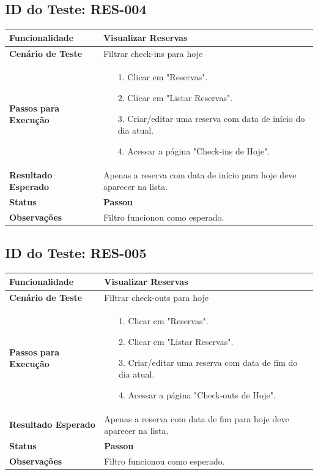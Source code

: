 \documentclass[
	12pt,				%
	openany,			%
	oneside,			%
	a4paper,			%
	english,			%
	french,				%
	spanish,			%
	brazil				%
	]{abntex2}
\begin{document}
\begin{apendicesenv}
\subsection*{ID do Teste: RES-004}
\begin{tabular}{@{} p{5cm} p{11cm} @{}}
	\toprule
	\textbf{Funcionalidade} & Visualizar Reservas \\
	\midrule
	\textbf{Cenário de Teste} & Filtrar check-ins para hoje \\
	\midrule
	\textbf{Passos para Execução} &
	\begin{itemize} \itemsep0em 
		\item[1.] Clicar em "Reservas".
		\item[2.] Clicar em "Listar Reservas".
		\item[3.] Criar/editar uma reserva com data de início do dia atual.
		\item[4.] Acessar a página "Check-ins de Hoje".
	\end{itemize} \\
	\midrule
	\textbf{Resultado Esperado} & Apenas a reserva com data de início para hoje deve aparecer na lista. \\
	\midrule
	\textbf{Status} & \textbf{Passou} \\
	\midrule
	\textbf{Observações} & Filtro funcionou como esperado. \\
	\bottomrule
\end{tabular}
\vspace{1cm}

\subsection*{ID do Teste: RES-005}
\begin{tabular}{@{} p{5cm} p{11cm} @{}}
	\toprule
	\textbf{Funcionalidade} & Visualizar Reservas \\
	\midrule
	\textbf{Cenário de Teste} & Filtrar check-outs para hoje \\
	\midrule
	\textbf{Passos para Execução} &
	\begin{itemize} \itemsep0em 
		\item[1.] Clicar em "Reservas".
		\item[2.] Clicar em "Listar Reservas".
		\item[3.] Criar/editar uma reserva com data de fim do dia atual.
		\item[4.] Acessar a página "Check-outs de Hoje".
	\end{itemize} \\
	\midrule
	\textbf{Resultado Esperado} & Apenas a reserva com data de fim para hoje deve aparecer na lista. \\
	\midrule
	\textbf{Status} & \textbf{Passou} \\
	\midrule
	\textbf{Observações} & Filtro funcionou como esperado. \\
	\bottomrule
\end{tabular}
\vspace{1cm}


\end{apendicesenv}
\end{document}
